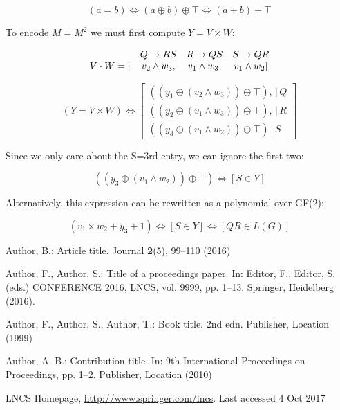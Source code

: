 \documentclass[runningheads]{llncs}
\begin{document}
\[
  (a = b) \Leftrightarrow (a \oplus b) \oplus \top \Leftrightarrow (a + b) + \top
\]

To encode $M = M^2$ we must first compute $Y = V \times W$:

\[
  \begin{array}{c c c c}
    & Q \to RS & R \to QS & S \to QR \\
    V \cdot W = [&v_2 \land w_3, & v_1 \land w_3, & v_1 \land w_2]
  \end{array}
\]

\[
  (Y = V \times W) \Leftrightarrow \left[\begin{array}{c}
                                           ((y_1 \oplus (v_2 \land w_3)) \oplus \top), \, | \, Q \\
                                           ((y_2 \oplus (v_1 \land w_3)) \oplus \top), \, | \, R \\
                                           ((y_3 \oplus (v_1 \land w_2)) \oplus \top) \, | \, S
  \end{array}\right]
\]

Since we only care about the S=3rd entry, we can ignore the first two:

\[
  ((y_3 \oplus (v_1 \land w_2)) \oplus \top) \Leftrightarrow [S \in Y]
\]

Alternatively, this expression can be rewritten as a polynomial over GF(2):

\[
  (v_1 \times w_2 + y_3 + 1) \Leftrightarrow [S \in Y] \Leftrightarrow [Q R \in L(G)]
\]

%
%
%
% 
% 
%
\begin{thebibliography}{8}
Author, B.: Article title. Journal \textbf{2}(5), 99--110 (2016)

Author, F., Author, S.: Title of a proceedings paper. In: Editor,
F., Editor, S. (eds.) CONFERENCE 2016, LNCS, vol. 9999, pp. 1--13.
Springer, Heidelberg (2016). 

Author, F., Author, S., Author, T.: Book title. 2nd edn. Publisher,
Location (1999)

Author, A.-B.: Contribution title. In: 9th International Proceedings
on Proceedings, pp. 1--2. Publisher, Location (2010)

LNCS Homepage, \url{http://www.springer.com/lncs}. Last accessed 4
Oct 2017
\end{thebibliography}
\end{document}
